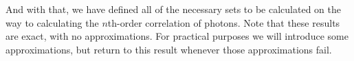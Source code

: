 \documentclass{article}
\newcommand{\braces}[1]{\ensuremath{\left\lbrace #1 \right\rbrace}}
\newcommand{\setbuilder}[2]{\ensuremath{\braces{#1 \left| #2 \right.}}}
\renewcommand{\vec}{\boldsymbol}
\newcommand{\abs}[1]{\ensuremath{\left|#1\right|}}
\newcommand{\photon}{\ensuremath{\gamma}}
\newcommand{\photons}{\ensuremath{\Gamma}}
\newcommand{\integrationtime}{\ensuremath{\Xi}}
\newcommand{\nth}{\ensuremath{n}\textnormal{th}}
\begin{document}
And with that, we have defined all of the necessary sets to be calculated on the way to calculating the \nth-order correlation of photons. Note that these results are exact, with no approximations. For practical purposes we will introduce some approximations, but return to this result whenever those approximations fail.

\end{document}
